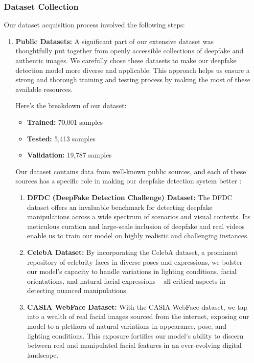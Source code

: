 \subsubsection{Dataset Collection}

\noindent Our dataset acquisition process involved the following steps:

\begin{enumerate}
    \item \textbf{Public Datasets:} A significant part of our extensive dataset was thoughtfully put together from openly accessible collections of deepfake and authentic images. We carefully chose these datasets to make our deepfake detection model more diverse and applicable. This approach helps us ensure a strong and thorough training and testing process by making the most of these available resources.

          Here's the breakdown of our dataset:
          \begin{itemize}
              \item \textbf{Trained:} 70,001 samples
              \item \textbf{Tested:} 5,413 samples
              \item \textbf{Validation:} 19,787 samples
          \end{itemize}
          Our dataset contains data from well-known public sources, and each of these sources has a specific role in making our deepfake detection system better :

          \begin{enumerate}
              \item \textbf{DFDC (DeepFake Detection Challenge) Dataset:} The DFDC dataset offers an invaluable benchmark for detecting deepfake manipulations across a wide spectrum of scenarios and visual contexts. Its meticulous curation and large-scale inclusion of deepfake and real videos enable us to train our model on highly realistic and challenging instances.

              \item \textbf{CelebA Dataset:} By incorporating the CelebA dataset, a prominent repository of celebrity faces in diverse poses and expressions, we bolster our model's capacity to handle variations in lighting conditions, facial orientations, and natural facial expressions – all critical aspects in detecting nuanced manipulations.

              \item \textbf{CASIA WebFace Dataset:} With the CASIA WebFace dataset, we tap into a wealth of real facial images sourced from the internet, exposing our model to a plethora of natural variations in appearance, pose, and lighting conditions. This exposure fortifies our model's ability to discern between real and manipulated facial features in an ever-evolving digital landscape.
          \end{enumerate}



\end{enumerate}
